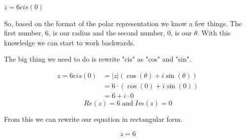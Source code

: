 \begin{problem}[21.]
    $z = 6 cis(0)$
\end{problem}

\begin{solution}
    So, based on the format of the polar representation we know a few things. The first number, $6$, is our radius and the second number, $0$, is our $\theta$. With this knowledge we can start to work backwards. 
    
    The big thing we need to do is rewrite "cis" as "cos" and "sin".
    
    \begin{align}
        z = 6 cis(0) &= |z| (\cos(\theta) + i \sin(\theta)) \\
        &= 6 \cdot (\cos(0) + i \sin(0)) \\
        &= 6 + i \cdot 0
    \end{align}
    \[\boxed{Re(z) = 6} \; \text{and} \; \boxed{Im(z) = 0}\]
    
    From this we can rewrite our equation in rectangular form. 
    
    \[\boxed{z = 6}\]
\end{solution}